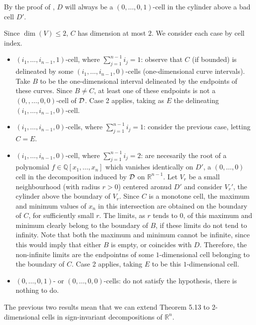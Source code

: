 \documentclass[
]{book}
\theoremstyle{definition}
\theoremstyle{definition}
\theoremstyle{definition}
\theoremstyle{definition}
\theoremstyle{remark}
\begin{document}
By the proof of \citep[Theorem 4.4]{lazard10}, \(D\) will always be a \((0,\ldots,0,1)\)-cell in the cylinder above a bad cell \(D'\).

Since \(\dim(V) \le 2\), \(C\) has dimension at most \(2\). We consider each case by cell index.

\begin{itemize}
\item
  \((i_1,\ldots,i_{n-1},1)\)-cell, where \(\sum_{j=1}^{n-1} i_j = 1\): observe that \(C\) (if bounded) is delineated by some \((i_1,\ldots,i_{n-1},0)\)-cells (one-dimensional curve intervals). Take \(B\) to be the one-dimensional interval delineated by the endpoints of these curves. Since \(B \neq C\), at least one of these endpoints is not a \((0,,\ldots,0,0)\)-cell of \(\cal D\). Case 2 applies, taking as \(E\) the delineating \((i_1,\ldots,i_{n-1},0)\)-cell.
\item
  \((i_1,\ldots,i_{n-1},0)\)-cells, where \(\sum_{j=1}^{n-1} i_j = 1\): consider the previous case, letting \(C = E\).
\item
  \((i_1,\ldots,i_{n-1},0)\)-cell, where \(\sum_{j=1}^{n-1} i_j = 2\):
  are necesarily the root of a polynomial \(f \in \mathbb{Q}[x_1,\ldots,x_n]\) which vanishes identically on \(D'\), a \((0,\ldots,0)\) cell in the decomposition induced by \(\cal D\) on \(\mathbb{R}^{n-1}\).
  Let \(V_r\) be a small neighbourhood (with radius \(r > 0\)) centered aronud \(D'\) and consider \(V_r'\), the cylinder above the boundary of \(V_r\). Since \(C\) is a monotone cell, the maximum and minimum values of \(x_n\) in this intersection are obtained on the boundary of \(C\), for sufficiently small \(r\). The limits, as \(r\) tends to \(0\), of this maximum and minimum clearly belong to the boundary of \(B\), if these limits do not tend to infinity. Note that both the maximum and minimum cannot be infinite, since this would imply that either \(B\) is empty, or coincides with \(D\). Therefore, the non-infinite limits are the endpointns of some \(1\)-dimensional cell belonging to the boundary of \(C\). Case 2 applies, taking \(E\) to be this \(1\)-dimensional cell.
\item
  \((0,\ldots,0,1)\)- or \((0,\ldots,0,0)\)-cells: do not satisfy the hypothesis, there is nothing to do.
\end{itemize}

The previous two results mean that we can extend \citet{lazard10} Theorem 5.13 to 2-dimensional cells in sign-invariant decompositions of \(\mathbb{R}^n\).
\end{document}
